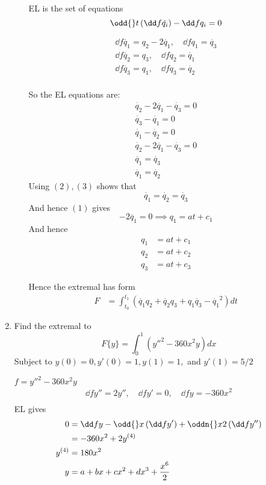 \documentclass{X:/Documents/Coding/Latex/myassignment}
\begin{document}
\begin{enumerate}
\begin{enumerate}
	EL is the set of equations
	\[\odd{}t\left( \dd f{\dot{q_i}}\right) - \dd f{q_i} =0\]

	\begin{align*}
		\dd f{\dot{q_1}} = q_2 - 2\dot{q_1} ,\quad \dd f{q_1} = \dot{q_3}\\
		\dd f{\dot{q_2}} = q_3 ,\quad \dd f{q_2} = \dot{q_1}\\
		\dd f{\dot{q_3}} = q_1 ,\quad \dd f{q_3} = \dot{q_2}\\
	\end{align*}

	So the EL equations are:
	\begin{align*}
		\dot{q_2} - 2\ddot{q_1} - \dot{q_3} = 0\\
		\dot{q_3} - \dot{q_1} =0 \\
		\dot{q_1} - \dot{q_2} = 0
	\end{align*}
	\begin{align}
		\dot{q_2} - 2\ddot{q_1} - \dot{q_3} = 0\\
		\dot{q_1} = \dot{q_3} \\
		\dot{q_1} = \dot{q_2} 		
	\end{align}
	Using $(2),(3)$ shows that 
	\[\dot{q_1} = \dot{q_2} = \dot{q_3}\]
	And hence $(1)$ gives
	\[ - 2\ddot{q_1} = 0 \implies q_1 = at + c_1\]
	And hence 
	\begin{align*}
		q_1 &= at + c_1\\
		q_2 &= at + c_2\\
		q_3 &= at + c_3
	\end{align*}

	Hence the extremal has form
	\begin{align*}
		 F &= \int_{t_0}^{t_1} \left(\dot{q_1} q_2 + \dot{q_2} q_3 + q_1 \dot{q_3} - \dot{q_1}^2\right) dt
	\end{align*}
\end{enumerate}

\item Find the extremal to
\[F\{y\} = \int_0^1 \left(y''^2 - 360 x^2 y\right) dx\]
Subject to $y(0) = 0, y'(0) = 1, y(1) =1,$ and $y'(1) = 5/2$

$f =y''^2 - 360 x^2 y $
\begin{align*}
	\dd f{y''} = 2y'',\quad \dd f{y'} = 0 ,\quad \dd fy = -360 x^2\\
\end{align*}
EL gives
\begin{align*}
	0 &=\dd fy - \odd{}x \left(\dd f{y'}\right) + \oddn{}x2 \left(\dd f{y''}\right)\\
	&=	-360x^2 + 2y^{(4)}\\
	y^{(4)} &= 180x^2\\
	y &= a + bx + cx^2 + dx^3 + \frac{x^6}{2}
\end{align*}


\end{enumerate}
\end{document}
